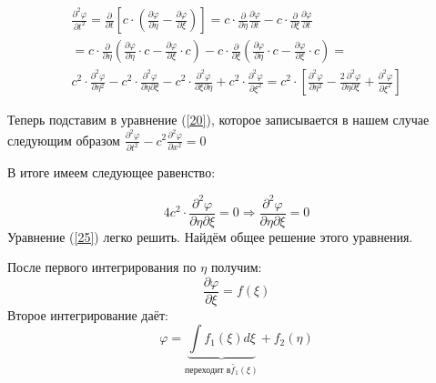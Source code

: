 \documentclass[14pt,a4paper,oneside]{extarticle}	%
\begin{document}
 \begin{eqnarray}\label{24}
\frac{\partial^{2} \varphi}{\partial t^{2}} = \frac{\partial}{\partial t}\left[ c \cdot \left( \frac{\partial \varphi}{\partial \eta} - \frac{\partial \varphi}{\partial \xi} \right)\right]  = c \cdot \frac{\partial }{\partial \eta}\frac{\partial \varphi}{\partial t} - c\cdot \frac{\partial}{\partial \xi}\frac{\partial \varphi}{\partial t} \\
= c\cdot \frac{\partial }{\partial \eta} \left( \frac{\partial \varphi}{\partial \eta}\cdot c -  \frac{\partial \varphi}{\partial \xi}\cdot c \right) - c\cdot \frac{\partial }{\partial \xi} \left( \frac{\partial \varphi}{\partial \eta}\cdot c - \frac{\partial \varphi}{\partial \xi} \cdot c \right) = \\
c^{2}\cdot\frac{\partial^{2} \varphi}{\partial \eta^{2}} - c^{2}\cdot \frac{\partial^{2} \varphi}{\partial \eta \partial \xi} - c^{2}\cdot \frac{\partial^{2} \varphi}{\partial \xi \partial \eta} + c^{2}\cdot \frac{\partial^{2} \varphi}{\partial \xi^{2}} = 
c^{2}\cdot \left[ \frac{\partial^{2} \varphi}{\partial \eta^{2}} - \frac{2\:\partial^{2} \varphi}{\partial \eta \partial \xi} +  \frac{\partial^{2} \varphi}{\partial \xi^{2}}\right] 
\end{eqnarray}

Теперь подставим в уравнение (\ref{20}), которое записывается в нашем случае следующим образом $ \frac{\partial^{2} \varphi}{\partial t^{2}} - c^{2} \frac{\partial^{2} \varphi}{\partial x^{2}} = 0 $

В итоге имеем следующее равенство:

\begin{equation}\label{25}
4c^{2}\cdot \frac{\partial^{2} \varphi}{\partial \eta \partial \xi} = 0 \Rightarrow \frac{\partial^{2} \varphi}{\partial \eta \partial \xi} = 0
\end{equation}
Уравнение (\ref{25}) легко решить.
Найдём общее решение этого уравнения.

После первого интегрирования по $ \eta $ получим:
\begin{equation}\label{26}
\frac{\partial \varphi}{\partial \xi} = f(\xi)
\end{equation}
Второе интегрирование даёт:
\begin{equation}\label{27}
\varphi = \underbrace{\int f_{1}(\xi)d\xi}_{\text{переходит в}\tilde{f_{1}}(\xi)} + f_{2}(\eta)
\end{equation}
\end{document}

